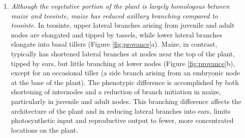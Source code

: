 \documentclass[9pt,twocolumn,twoside]{rilabRxiv}
\begin{document}
\begin{enumerate}
\begin{figure}
        \caption{\label{fig:teosinte} (a) Teosinte infructescence showing alternate initiation of each set of spikelet pairs, with each kernel in a single rank (rank). Husk leaves removed. (b) Each teosinte fruitcase contains a single kernel, as the pedicellate spikelet does not mature. The outer glume (og) of the sessile spikelet (ss) forms a closed outer surface of the fruitcase, while the inner glume (ig) is found within the fruitcase. The cupule (cup) forms the other sides of the fruitcase.}
\end{figure}


\item \textit{Although the vegetative portion of the plant is largely homologous between maize and teosinte, maize has reduced axillary branching compared to teosinte.}
  In teosinte, upper lateral branches arising from juvenile and adult nodes are elongated and tipped by tassels, while lower lateral branches elongate into basal tillers \citep{doebley1997} (Figure \ref{fig:provance}a).
  Maize, in contrast, typically has shortened lateral branches at nodes near the top of the plant, tipped by ears, but little branching at lower nodes (Figure \ref{fig:provance}b), except for an occasional tiller (a side branch arising from an embryonic node at the base of the plant).
The phenotypic difference is accomplished by both shortening of internodes and a reduction of branch initiation in maize, particularly in juvenile and adult nodes.
This branching difference affects the architecture of the plant and in reducing lateral branches into ears, limits photosynthetic input and reproductive output to fewer, more concentrated locations on the plant.

\end{enumerate}
\end{document}
